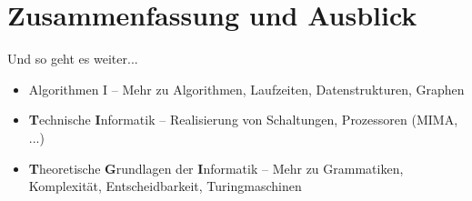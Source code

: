 \def\abbrsize{\footnotesize}

\appendix
\beginbackup

\section{Zusammenfassung und Ausblick}

\begin{frame}
	
	\begin{block}{Und so geht es weiter...}
		\vspace{-.3\baselineskip}
		\begin{itemize}
			\item Algorithmen I -- Mehr zu Algorithmen, Laufzeiten, Datenstrukturen, Graphen
			\item \textbf{T}{\abbrsize echnische} \textbf{I}{\abbrsize nformatik} -- Realisierung von Schaltungen, Prozessoren (MIMA, ...)
			\item \textbf{T}{\abbrsize heoretische} \textbf{G}{\abbrsize rundlagen der} \textbf{I}{\abbrsize nformatik} -- Mehr zu Grammatiken, Komplexität, Entscheidbarkeit, Turingmaschinen
		\end{itemize}
	\end{block}
\end{frame}



